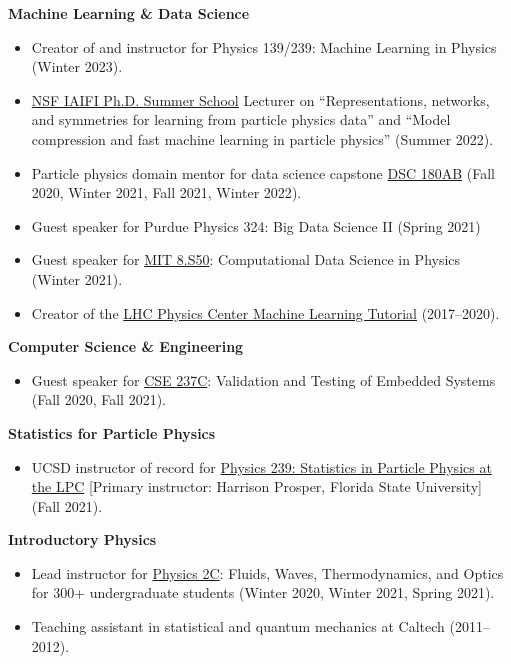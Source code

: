 \documentclass[11pt]{res}
\begin{document}
\begin{resume}
  \textbf{Machine Learning \& Data Science}
  \begin{itemize}
    \itemsep-0.3em
    \item Creator of and instructor for Physics 139/239: Machine Learning in Physics ({Winter 2023}).
    \item \href{https://iaifi.org/phd-summer-school.html}{NSF IAIFI Ph.D. Summer School} Lecturer on ``Representations, networks, and symmetries for learning from particle physics data'' and ``Model compression and fast machine learning in particle physics'' (Summer 2022).
    \item Particle physics domain mentor for data science capstone \href{https://jmduarte.github.io/capstone-particle-physics-domain}{DSC 180AB} ({Fall 2020, Winter 2021, Fall 2021, Winter 2022}).
    \item Guest speaker for Purdue Physics 324: Big Data Science II ({Spring 2021})
    \item Guest speaker for \href{https://github.com/violatingcp/MIT_8.S50}{MIT 8.S50}: Computational Data Science in Physics ({Winter 2021}).
    \item Creator of the \href{https://github.com/FNALLPC/machine-learning-hats}{LHC Physics Center Machine Learning Tutorial} ({2017--2020}).
  \end{itemize}

  \textbf{Computer Science \& Engineering}
  \begin{itemize}
    \itemsep-0.3em
    \item Guest speaker for \href{http://kastner.ucsd.edu/ryan/cse237c/}{CSE 237C}: Validation and Testing of Embedded Systems ({Fall 2020, Fall 2021}).
  \end{itemize}

  \textbf{Statistics for Particle Physics}
  \begin{itemize}
    \itemsep-0.3em
    \item UCSD instructor of record for \href{https://indico.cern.ch/event/1066958/}{Physics 239: Statistics in Particle Physics at the LPC} [Primary instructor: Harrison Prosper, Florida State University] ({Fall 2021}).
  \end{itemize}

  \textbf{Introductory Physics}
  \begin{itemize}
    \itemsep-0.3em
    \item Lead instructor for \href{https://jduarte.physics.ucsd.edu/phys2c/index.html}{Physics 2C}: Fluids, Waves, Thermodynamics, and Optics for 300+ undergraduate students ({Winter 2020, Winter 2021, Spring 2021}).
    \item Teaching assistant in statistical and quantum mechanics at Caltech ({2011--2012}).
  \end{itemize}


\end{resume}
\end{document}
